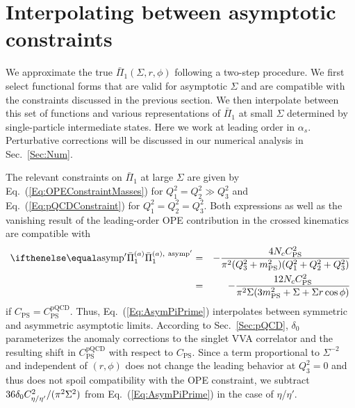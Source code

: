 \section{Interpolating between asymptotic constraints}
\label{Sec:HEInt}

We approximate the true $\bar{\Pi}_1(\Sigma, r, \phi)$ following a two-step procedure. We first select functional forms that are valid for asymptotic $\Sigma$ and are compatible with the constraints discussed in the previous section. We then interpolate between this set of functions and various representations of $\bar{\Pi}_1$ at small $\Sigma$ determined by single-particle intermediate states. Here we work at leading order in $\alpha_s$. Perturbative corrections will be discussed in our numerical analysis in Sec.~\ref{Sec:Num}.

The relevant constraints on $\bar{\Pi}_1$ at large $\Sigma$ are given by Eq.~(\ref{Eq:OPEConstraintMasses}) for $Q_1^2 = Q_2^2 \gg Q_3^2$ and Eq.~(\ref{Eq:pQCDConstraint}) for $Q_1^2 = Q_2^2 = Q_3^2$. Both expressions as well as the vanishing result of the leading-order OPE contribution in the crossed kinematics are compatible with
\begin{eqnarray}
\PiPS[\text{asymp}'] & = & -\frac{4 N_c C_\text{PS}^2}{\pi^2(Q_3^2 + m_\text{PS}^2)(Q_1^2 + Q_2^2 + Q_3^2)} \nonumber \\
& = & -\frac{12 N_c C_\text{PS}^2}{\pi^2 \Sigma (3m_\text{PS}^2 + \Sigma + \Sigma r \cos\phi)}
\label{Eq:AsymPiPrime}
\end{eqnarray}
if $ C_\text{PS} = C_\text{PS}^\text{pQCD} $. Thus, Eq.~(\ref{Eq:AsymPiPrime}) interpolates between symmetric and asymmetric asymptotic limits. According to Sec.~\ref{Sec:pQCD}, $\delta_0$ parameterizes the anomaly corrections to the singlet VVA correlator and the resulting shift in $C_\text{PS}^\text{pQCD}$ with respect to $C_\text{PS}$. Since a term proportional to $\Sigma^{-2}$ and independent of $(r, \phi)$ does not change the leading behavior at $Q_3^2 = 0$ and thus does not spoil compatibility with the OPE constraint, we subtract $36 \delta_0 C_{{\eta / \eta'}}^2/(\pi^2 \Sigma^2)$ from Eq.~(\ref{Eq:AsymPiPrime}) in the case of $\eta$/$\eta'$.

